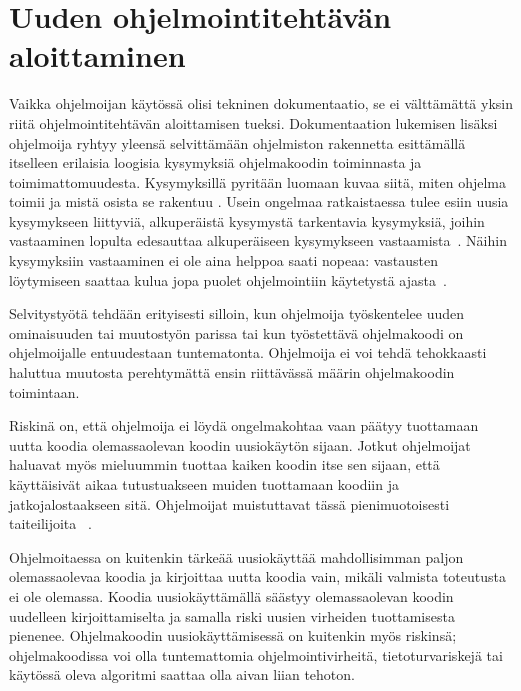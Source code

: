 \documentclass[finnish]{tktltiki2}
\theoremstyle{definition}
\theoremstyle{remark}
\begin{document}
\section{Uuden ohjelmointitehtävän aloittaminen}
\label{section:ekatk}

Vaikka ohjelmoijan käytössä olisi tekninen dokumentaatio, se ei välttämättä yksin riitä ohjelmointitehtävän aloittamisen tueksi. Dokumentaation lukemisen lisäksi ohjelmoija ryhtyy yleensä selvittämään ohjelmiston rakennetta esittämällä itselleen erilaisia loogisia kysymyksiä ohjelmakoodin toiminnasta ja toimimattomuudesta. Kysymyksillä pyritään luomaan kuvaa siitä, miten ohjelma toimii ja mistä osista se rakentuu \cite{g_search_code, questions-during-software-evolution-tasks,asking-and-answering-api-questions}. Usein ongelmaa ratkaistaessa tulee esiin uusia kysymykseen liittyviä, alkuperäistä kysymystä tarkentavia kysymyksiä, joihin vastaaminen lopulta edesauttaa alkuperäiseen kysymykseen vastaamista~\cite{questions-during-software-evolution-tasks}. Näihin kysymyksiin vastaaminen ei ole aina helppoa saati nopeaa: vastausten löytymiseen saattaa kulua jopa puolet ohjelmointiin käytetystä ajasta~\cite{eliciting-design-requirements-for-maintenance-oriented-ides}.

Selvitystyötä tehdään erityisesti silloin, kun ohjelmoija työskentelee uuden ominaisuuden tai muutostyön parissa tai kun työstettävä ohjelmakoodi on ohjelmoijalle entuudestaan tuntematonta. Ohjelmoija ei voi tehdä tehokkaasti haluttua muutosta perehtymättä ensin riittävässä määrin ohjelmakoodin toimintaan.

Riskinä on, että ohjelmoija ei löydä ongelmakohtaa vaan päätyy tuottamaan uutta koodia olemassaolevan koodin uusiokäytön sijaan. Jotkut ohjelmoijat haluavat myös mieluummin tuottaa kaiken koodin itse sen sijaan, että käyttäisivät aikaa tutustuakseen muiden tuottamaan koodiin ja jatkojalostaakseen sitä. Ohjelmoijat muistuttavat tässä pienimuotoisesti taiteilijoita ~\cite{hackers-and-painters}.

Ohjelmoitaessa on kuitenkin tärkeää uusiokäyttää mahdollisimman paljon olemassaolevaa koodia ja kirjoittaa uutta koodia vain, mikäli valmista toteutusta ei ole olemassa. Koodia uusiokäyttämällä säästyy olemassaolevan koodin uudelleen kirjoittamiselta ja samalla riski uusien virheiden tuottamisesta pienenee. Ohjelmakoodin uusiokäyttämisessä on kuitenkin myös riskinsä; ohjelmakoodissa voi olla tuntemattomia ohjelmointivirheitä, tietoturvariskejä tai käytössä oleva algoritmi saattaa olla aivan liian tehoton.
\end{document}
